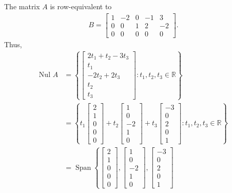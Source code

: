 \documentclass[12pt,letterpaper,reqno]{article}
\numberwithin{equation}{section}
\newcommand{\R}{\ensuremath{\mathbb R}}
\newcommand{\Nul}{\text{Nul }}
\DeclareMathOperator{\Span}{Span}
\begin{document}
{\color{red}
\begin{solution}
The matrix $A$ is row-equivalent to 
\begin{align*}
	B=\begin{bmatrix}
		1 & -2 & 0 & -1 & 3 \\
		0 & 0 & 1 & 2 & -2 \\
		0 & 0 & 0 & 0 & 0
	\end{bmatrix}.
\end{align*}
Thus,
\begin{align*}
	\Nul A&=\left\{\begin{bmatrix}
		2t_1+t_2-3t_3 \\
		t_1 \\
		-2t_2+2t_3 \\
		t_2 \\
		t_3
	\end{bmatrix}:t_1,t_2,t_3 \in \R\right\} \\
	&=\left\{t_1\begin{bmatrix}
		2 \\ 1 \\ 0 \\ 0 \\ 0
	\end{bmatrix}+t_2\begin{bmatrix}
		1 \\ 0 \\ -2 \\ 1 \\ 0
	\end{bmatrix}+t_3\begin{bmatrix}
		-3 \\ 0 \\ 2 \\ 0 \\1
	\end{bmatrix}:t_1,t_2,t_3 \in \R\right\} \\
	&=\Span\left\{\begin{bmatrix}
		2 \\ 1 \\ 0 \\ 0 \\ 0
	\end{bmatrix}, \begin{bmatrix}
		1 \\ 0 \\ -2 \\ 1 \\ 0
	\end{bmatrix}, \begin{bmatrix}
		-3 \\ 0 \\ 2 \\ 0 \\1

\end{bmatrix}
\end{align*}
\end{solution}}
\end{document}
